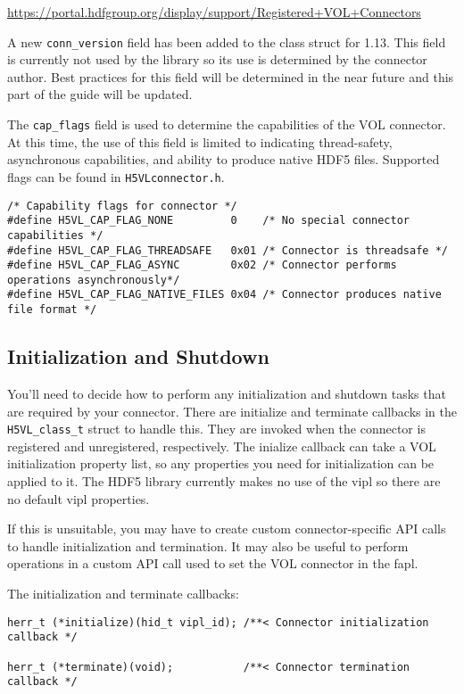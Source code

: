 \url{https://portal.hdfgroup.org/display/support/Registered+VOL+Connectors}

A new {\tt conn\_version} field has been added to the class struct for 1.13.
This field is currently not used by the library so its use is determined by
the connector author. Best practices for this field will be determined in
the near future and this part of the guide will be updated.

The {\tt cap\_flags} field is used to determine the capabilities of the VOL
connector. At this time, the use of this field is limited to indicating
thread-safety, asynchronous capabilities, and ability to produce native
HDF5 files. Supported flags can be found in {\tt H5VLconnector.h}.

\begin{lstlisting}
/* Capability flags for connector */
#define H5VL_CAP_FLAG_NONE         0    /* No special connector capabilities */
#define H5VL_CAP_FLAG_THREADSAFE   0x01 /* Connector is threadsafe */
#define H5VL_CAP_FLAG_ASYNC        0x02 /* Connector performs operations asynchronously*/
#define H5VL_CAP_FLAG_NATIVE_FILES 0x04 /* Connector produces native file format */
\end{lstlisting}

\subsection{Initialization and Shutdown}

You'll need to decide how to perform any initialization and shutdown tasks that
are required by your connector. There are initialize and terminate callbacks
in the {\tt H5VL\_class\_t} struct to handle this. They are invoked when
the connector is registered and unregistered, respectively. The inialize
callback can take a VOL initialization property list, so any properties you
need for initialization can be applied to it. The HDF5 library currently makes
no use of the vipl so there are no default vipl properties.

If this is unsuitable, you may have to create custom connector-specific API calls to handle
initialization and termination. It may also be useful to perform operations in
a custom API call used to set the VOL connector in the fapl.

The initialization and terminate callbacks:
\begin{lstlisting}
herr_t (*initialize)(hid_t vipl_id); /**< Connector initialization callback */

herr_t (*terminate)(void);           /**< Connector termination callback */
\end{lstlisting}

